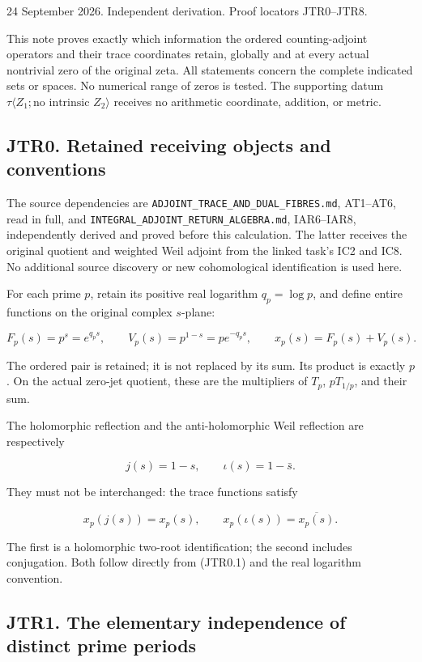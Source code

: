 \documentclass[
]{article}
\begin{document}
24 September 2026. Independent derivation. Proof locators JTR0--JTR8.

This note proves exactly which information the ordered counting-adjoint
operators and their trace coordinates retain, globally and at every
actual nontrivial zero of the original zeta. All statements concern the
complete indicated sets or spaces. No numerical range of zeros is
tested. The supporting datum
\(\tau\langle Z_1;\text{no intrinsic }Z_2\rangle\) receives no
arithmetic coordinate, addition, or metric.

\subsection{JTR0. Retained receiving objects and
conventions}\label{jtr0.-retained-receiving-objects-and-conventions}

The source dependencies are
\nolinkurl{ADJOINT_TRACE_AND_DUAL_FIBRES.md}, AT1--AT6, read in full,
and \nolinkurl{INTEGRAL_ADJOINT_RETURN_ALGEBRA.md}, IAR6--IAR8,
independently derived and proved before this calculation. The latter
receives the original quotient and weighted Weil adjoint from the linked
task's IC2 and IC8. No additional source discovery or new cohomological
identification is used here.

For each prime \(p\), retain its positive real logarithm \(q_p=\log p\),
and define entire functions on the original complex \(s\)-plane:

\[
F_p(s)=p^s=e^{q_ps},\qquad
V_p(s)=p^{1-s}=p e^{-q_ps},\qquad
x_p(s)=F_p(s)+V_p(s).
\tag{JTR0.1}
\]

The ordered pair is retained; it is not replaced by its sum. Its product
is exactly \(p\). On the actual zero-jet quotient, these are the
multipliers of \(T_p\), \(pT_{1/p}\), and their sum.

The holomorphic reflection and the anti-holomorphic Weil reflection are
respectively

\[
j(s)=1-s,\qquad \iota(s)=1-\bar s.
\tag{JTR0.2}
\]

They must not be interchanged: the trace functions satisfy

\[
x_p(j(s))=x_p(s),\qquad
x_p(\iota(s))=\overline{x_p(s)}.
\tag{JTR0.3}
\]

The first is a holomorphic two-root identification; the second includes
conjugation. Both follow directly from (JTR0.1) and the real logarithm
convention.

\subsection{JTR1. The elementary independence of distinct prime
periods}\label{jtr1.-the-elementary-independence-of-distinct-prime-periods}
\end{document}

